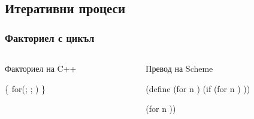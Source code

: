 \documentclass[alsotrans]{beamerswitch}
\begin{document}
\subsection{Итеративни процеси}

\begin{frame}[fragile]
  \frametitle{Факториел с цикъл}

  \begin{overlayarea}{\textwidth}{.5\textheight}
  \begin{columns}[T,onlytextwidth]
    \begin{column}{.5\textwidth}
      Факториел на C++\\
\begin{semiverbatim}
 \{
  for(; ; )
\}
\end{semiverbatim}
    \end{column}
    \pause
    \begin{column}{.5\textwidth}
      Превод на Scheme\\
\begin{semiverbatim}
(define (for n  )
  (if 
      (for n  )
      ))

  (for n  ))
\end{semiverbatim}
    \end{column}
  \end{columns}
\end{overlayarea}
\end{frame}
\end{document}
